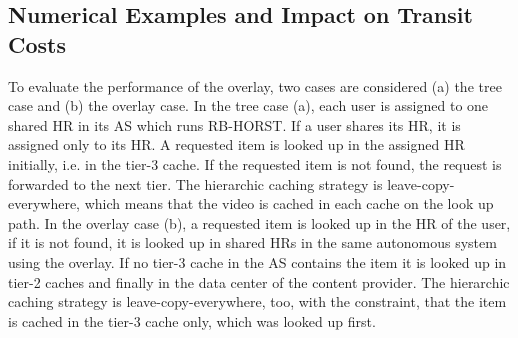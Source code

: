 \subsection{Numerical Examples and Impact on Transit Costs}

To evaluate the performance of the overlay, two cases are considered (a) the tree case and (b) the overlay case. In the tree case (a), each user is assigned to one shared HR in its AS which runs RB-HORST. If a user shares its HR, it is assigned only to its HR. A requested item is looked up in the assigned HR initially, i.e. in the tier-3 cache. If the requested item is not found, the request is forwarded to the next tier. The hierarchic caching strategy is leave-copy-everywhere, which means that the video is cached in each cache on the look up path. In the overlay case (b), a requested item is looked up in the HR of the user, if it is not found, it is looked up in shared HRs in the same autonomous system using the overlay. If no tier-3 cache in the AS contains the item it is looked up in tier-2 caches and finally in the data center of the content provider. The hierarchic caching strategy is leave-copy-everywhere, too, with the constraint, that the item is cached in the tier-3 cache only, which was looked up first.

